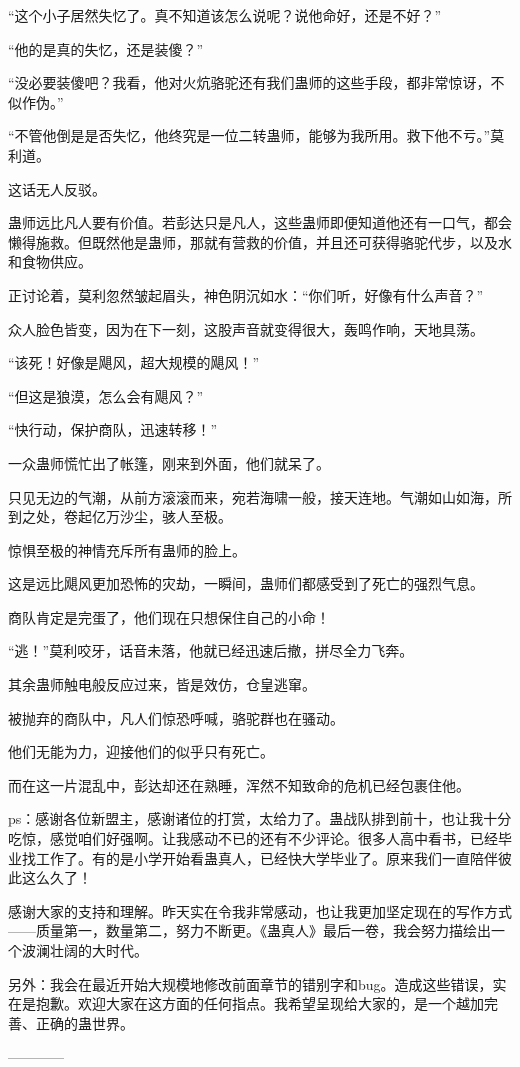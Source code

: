 \begin{this_body}
“这个小子居然失忆了。真不知道该怎么说呢？说他命好，还是不好？”

“他的是真的失忆，还是装傻？”

“没必要装傻吧？我看，他对火炕骆驼还有我们蛊师的这些手段，都非常惊讶，不似作伪。”

“不管他倒是是否失忆，他终究是一位二转蛊师，能够为我所用。救下他不亏。”莫利道。

这话无人反驳。

蛊师远比凡人要有价值。若彭达只是凡人，这些蛊师即便知道他还有一口气，都会懒得施救。但既然他是蛊师，那就有营救的价值，并且还可获得骆驼代步，以及水和食物供应。

正讨论着，莫利忽然皱起眉头，神色阴沉如水：“你们听，好像有什么声音？”

众人脸色皆变，因为在下一刻，这股声音就变得很大，轰鸣作响，天地具荡。

“该死！好像是飓风，超大规模的飓风！”

“但这是狼漠，怎么会有飓风？”

“快行动，保护商队，迅速转移！”

一众蛊师慌忙出了帐篷，刚来到外面，他们就呆了。

只见无边的气潮，从前方滚滚而来，宛若海啸一般，接天连地。气潮如山如海，所到之处，卷起亿万沙尘，骇人至极。

惊惧至极的神情充斥所有蛊师的脸上。

这是远比飓风更加恐怖的灾劫，一瞬间，蛊师们都感受到了死亡的强烈气息。

商队肯定是完蛋了，他们现在只想保住自己的小命！

“逃！”莫利咬牙，话音未落，他就已经迅速后撤，拼尽全力飞奔。

其余蛊师触电般反应过来，皆是效仿，仓皇逃窜。

被抛弃的商队中，凡人们惊恐呼喊，骆驼群也在骚动。

他们无能为力，迎接他们的似乎只有死亡。

而在这一片混乱中，彭达却还在熟睡，浑然不知致命的危机已经包裹住他。

ps：感谢各位新盟主，感谢诸位的打赏，太给力了。蛊战队排到前十，也让我十分吃惊，感觉咱们好强啊。让我感动不已的还有不少评论。很多人高中看书，已经毕业找工作了。有的是小学开始看蛊真人，已经快大学毕业了。原来我们一直陪伴彼此这么久了！

感谢大家的支持和理解。昨天实在令我非常感动，也让我更加坚定现在的写作方式——质量第一，数量第二，努力不断更。《蛊真人》最后一卷，我会努力描绘出一个波澜壮阔的大时代。

另外：我会在最近开始大规模地修改前面章节的错别字和bug。造成这些错误，实在是抱歉。欢迎大家在这方面的任何指点。我希望呈现给大家的，是一个越加完善、正确的蛊世界。

------------

\end{this_body}

